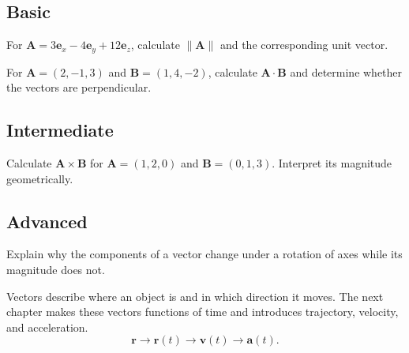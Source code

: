 \chapterexercisesheading
\subsection*{Basic}
\begin{chapterexercise}
For $\mathbf A=3\mathbf e_x-4\mathbf e_y+12\mathbf e_z$, calculate
$\lVert\mathbf A\rVert$ and the corresponding unit vector.
\end{chapterexercise}

\begin{chapterexercise}
For $\mathbf A=(2,-1,3)$ and $\mathbf B=(1,4,-2)$, calculate
$\mathbf A\cdot\mathbf B$ and determine whether the vectors are perpendicular.
\end{chapterexercise}

\subsection*{Intermediate}
\begin{chapterexercise}
Calculate $\mathbf A\times\mathbf B$ for
$\mathbf A=(1,2,0)$ and $\mathbf B=(0,1,3)$.
Interpret its magnitude geometrically.
\end{chapterexercise}

\subsection*{Advanced}
\begin{chapterexercise}
Explain why the components of a vector change under a rotation of axes while
its magnitude does not.
\end{chapterexercise}

\chapterlookaheadheading
\begin{lookingaheadbox}
Vectors describe where an object is and in which direction it moves.
The next chapter makes these vectors functions of time and introduces
trajectory, velocity, and acceleration.
\[
\mathbf r
\longrightarrow
\mathbf r(t)
\longrightarrow
\mathbf v(t)
\longrightarrow
\mathbf a(t).
\]
\end{lookingaheadbox}
